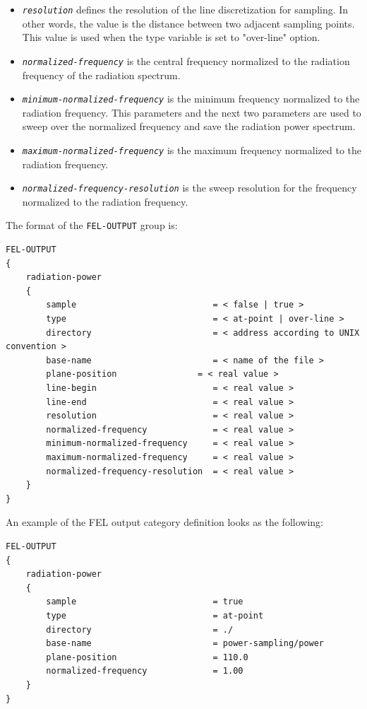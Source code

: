 \begin{enumerate}
\begin{itemize}
	\item {\tt \small \em resolution} defines the resolution of the line discretization for sampling. In other words, the value is the distance between two adjacent sampling points. This value is used when the type variable is set to "over-line" option.
	\item {\tt \small \em normalized-frequency} is the central frequency normalized to the radiation frequency of the radiation spectrum.
	\item {\tt \small \em minimum-normalized-frequency} is the minimum frequency normalized to the radiation frequency. This parameters and the next two parameters are used to sweep over the normalized frequency and save the radiation power spectrum.
	\item {\tt \small \em maximum-normalized-frequency} is the maximum frequency normalized to the radiation frequency.
	\item {\tt \small \em normalized-frequency-resolution} is the sweep resolution for the frequency normalized to the radiation frequency.
\end{itemize}
\end{enumerate}

The format of the \texttt{FEL-OUTPUT} group is:
\begin{Verbatim}[frame=single,fontsize=\small,tabsize=4]
FEL-OUTPUT
{
	radiation-power
	{
		sample                           = < false | true >
		type                             = < at-point | over-line >
		directory                        = < address according to UNIX convention >
		base-name                        = < name of the file >
		plane-position 		          = < real value >
		line-begin                       = < real value >
		line-end                         = < real value >
		resolution                       = < real value >
		normalized-frequency             = < real value >
		minimum-normalized-frequency     = < real value >
		maximum-normalized-frequency     = < real value >
		normalized-frequency-resolution  = < real value >
	}
}
\end{Verbatim}
An example of the FEL output category definition looks as the following:
\begin{snugshade}
\begin{Verbatim}[fontsize=\small, tabsize = 4]
FEL-OUTPUT
{
	radiation-power
	{
		sample                           = true
		type                             = at-point
		directory                        = ./
		base-name                        = power-sampling/power
		plane-position                   = 110.0
		normalized-frequency             = 1.00
	}
}
\end{Verbatim}
\end{snugshade} 